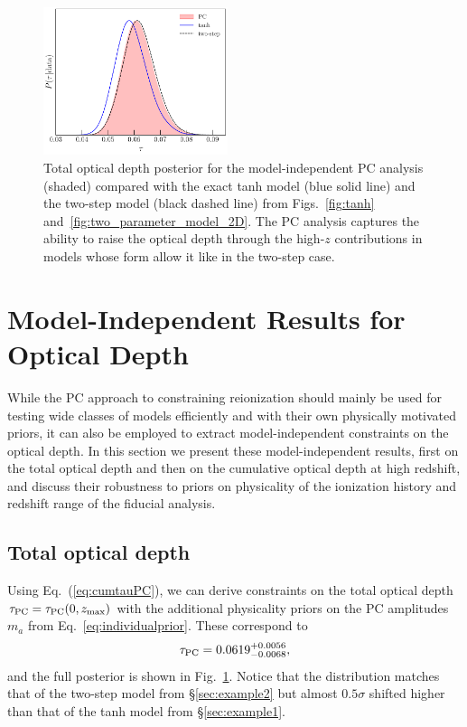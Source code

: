 \documentclass[prd,twocolumn,amsmath,amssymb,floatfix,superscriptaddress,nofootinbib]{revtex4-1}
\newcommand{\beq}{\begin{equation}}
\newcommand{\eeq}{\end{equation}}
\begin{document}
\begin{figure}[ht]
\includegraphics[width=0.48\textwidth]
{paper/plots/pl18_tau_posterior_tanh_vs_tanh_highz_vs_pc_dz_auto_zre_prior_6p1_normalized_by_max.pdf}
\caption{Total optical depth posterior for the model-independent PC analysis (shaded) compared with the exact tanh model (blue solid line) and the two-step model (black dashed line) from Figs.~\ref{fig:tanh} and~\ref{fig:two_parameter_model_2D}. The PC analysis captures the ability to raise the optical depth through the high-$z$ contributions in models whose form allow it like in the two-step case.
}
\label{fig:tauPC}
\end{figure}


\section{Model-Independent Results for Optical Depth}
\label{sec:modelindependent}

While the PC approach to constraining reionization should mainly be used for 
testing wide classes of models efficiently and with their own physically motivated priors, it can also be employed to extract model-independent constraints on the optical depth. 
In this section we present these model-independent results, 
first on the total optical depth and then on the cumulative optical depth at high redshift, and discuss their robustness to priors  on physicality of the ionization history and redshift range of the fiducial analysis.



\subsection{Total optical depth}

\label{sec:note_on_priors}


Using Eq.~(\ref{eq:cumtauPC}), we can derive constraints on the total optical
depth $\tau_{\rm PC}=\tau_{\rm PC}(0,z_{\rm max})$ with the additional physicality priors on the PC amplitudes $m_a$ from
Eq.~\ref{eq:individualprior}.  These 
correspond to 
%
\beq
\tau_{\rm PC} = 0.0619^{+0.0056}_{-0.0068},
\label{eq:tau_pc_zmax30}
\eeq  
%
and the full posterior is shown in Fig.~\ref{fig:tauPC}. 
Notice that the distribution matches that of the two-step model from \S \ref{sec:example2} but almost $0.5\sigma$ shifted higher than that of the tanh model from \S \ref{sec:example1}.  
\end{document}
